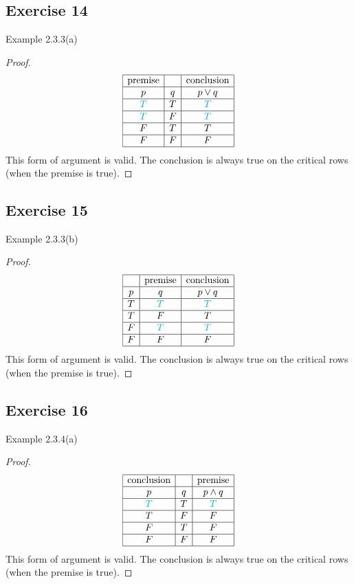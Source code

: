 \documentclass[14pt]{extarticle}
\begin{document}
\subsection{Exercise 14}
Example 2.3.3(a)

\begin{proof}
$$
\begin{array}{|c|c|c|}
\hline
\text{premise} & & \text{conclusion} \\
\hline
p & q & p \vee q \\
\hline
\color{cyan} T & T & \color{cyan} T \\
\hline
\color{cyan} T & F & \color{cyan} T \\
\hline
F & T & T \\
\hline
F & F & F \\
\hline
\end{array}
$$
This form of argument is valid. The conclusion is always true on the critical rows (when the premise is true).
\end{proof}

\subsection{Exercise 15}
Example 2.3.3(b)

\begin{proof}
$$
\begin{array}{|c|c|c|}
\hline
& \text{premise} & \text{conclusion} \\
\hline
p & q & p \vee q \\
\hline
T & \color{cyan} T & \color{cyan} T \\
\hline
T & F & T \\
\hline
F & \color{cyan} T & \color{cyan} T \\
\hline
F & F & F \\
\hline
\end{array}
$$
This form of argument is valid. The conclusion is always true on the critical rows (when the premise is true).
\end{proof}

\subsection{Exercise 16}
Example 2.3.4(a)

\begin{proof}
$$
\begin{array}{|c|c|c|}
\hline
\text{conclusion} & & \text{premise} \\
\hline
p & q & p \wedge q \\
\hline
\color{cyan} T & T & \color{cyan} T \\
\hline
T & F & F \\
\hline
F & T & F \\
\hline
F & F & F \\
\hline
\end{array}
$$
This form of argument is valid. The conclusion is always true on the critical rows (when the premise is true).
\end{proof}
\end{document}
